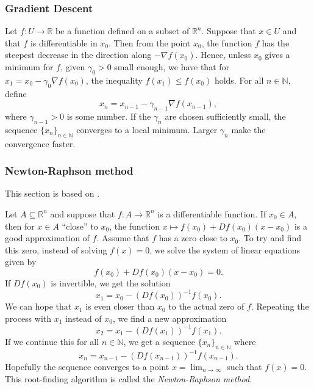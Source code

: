 \subsubsection{Gradient Descent}\label{sec:gradient descent}
Let $f\colon U\to\mathbb{R}$ be a function defined on a subset of $\mathbb{R}^n$. Suppose that $x\in U$ and that $f$ is differentiable in $x_0$. Then from the point $x_0$, the function $f$ has the steepest decrease in the direction along $-\nabla f(x_0)$. Hence, unless $x_0$ gives a minimum for $f$, given $\gamma_0 > 0$ small enough, we have that for $x_1 = x_0 - \gamma_0\nabla f(x_0)$, the inequality $f(x_1)\le f(x_0)$ holds. For all $n\in\mathbb{N}$, define
\begin{equation*}
    x_n = x_{n-1} - \gamma_{n-1}\nabla f(x_{n-1}),
\end{equation*}
where $\gamma_{n-1}>0$ is some number. If the $\gamma_{n}$ are chosen sufficiently small, the sequence $\{x_n\}_{n\in\mathbb{N}}$ converges to a local minimum. Larger $\gamma_{n}$ make the convergence faster.

\subsubsection{Newton-Raphson method}\label{sec:newton-raphson method}

This section is based on \cite[Section 5.6]{FVA}.

Let $A\subseteq\mathbb{R}^n$ and suppose that $f\colon A \to\mathbb{R}^n$ is a differentiable function. If $x_0\in A$, then for $x\in A$ “close” to $x_0$, the function $x\mapsto f(x_0)+Df(x_0)(x-x_0)$ is a good approximation of $f$. Assume that $f$ has a zero close to $x_0$. To try and find this zero, instead of solving $f(x)=0$, we solve the system of linear equations given by
\begin{equation*}
  f(x_0)+Df(x_0)(x-x_0) = 0.
\end{equation*}
If $Df(x_0)$ is invertible, we get the solution
\begin{equation*}
  x_1=x_0-(Df(x_0))^{-1}f(x_0).
\end{equation*}
We can hope that $x_1$ is even closer than $x_0$ to the actual zero of $f$. Repeating the process with $x_1$ instead of $x_0$, we find a new approximation
\begin{equation*}
  x_2=x_1-(Df(x_1))^{-1}f(x_1).
\end{equation*}
If we continue this for all $n\in\mathbb{N}$, we get a sequence $\{x_n\}_{n\in\mathbb{N}}$ where
\begin{equation*}
  x_n=x_{n-1}-(Df(x_{n-1}))^{-1}f(x_{n-1}).
\end{equation*}
Hopefully the sequence converges to a point $x=\lim_{n\to\infty}$ such that $f(x)=0$. This root-finding algorithm is called the \emph{Newton-Raphson method}.

